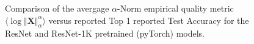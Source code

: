 \begin{figure}[t]
    \centering

    \caption{Comparison of the avergage $\alpha$-Norm empirical quality metric $\langle\log\Vert\mathbf{X}\Vert_{\alpha}^{\alpha}\rangle$ 
versus reported Top 1 reported Test Accuracy for the ResNet and ResNet-1K pretrained (pyTorch) models. }
    \label{fig:cv2-accuracy}
\end{figure}




